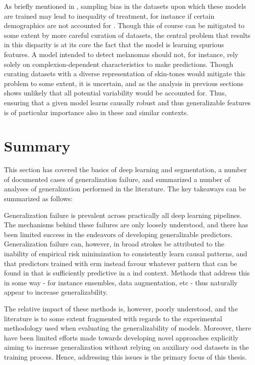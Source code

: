     As briefly mentioned in , sampling bias in the datasets upon which these models are trained may lead to inequality of treatment, for instance if certain demographics are not accounted for \cite{social_consequence_1}. Though this of course can be mitigated to some extent by more careful curation of datasets, the central problem that results in this disparity is at its core the fact that the model is learning spurious features. A model intended to detect melanomas should not, for instance, rely solely on complexion-dependent characteristics to make predictions. Though curating datasets with a diverse representation of skin-tones would mitigate this problem to some extent, it is uncertain, and as the analysis in previous sections shows unlikely that all potential variability would be accounted for. Thus, ensuring that a given model learns causally robust and thus generalizable features is of particular importance also in these and similar contexts. 
    
    
\section{Summary}
This section has covered the basics of deep learning and segmentation, a number of documented cases of generalization failure, and summarized a number of analyses of generalization performed in the literature. The key takeaways can be summarized as follows: 

Generalization failure is prevalent across practically all deep learning pipelines. The mechanisms behind these failures are only loosely understood, and there has been limited success in the endeavors of developing generalizable predictors. Generalization failure can, however, in broad strokes be attributed to the inability of empirical risk minimization to consistently learn causal patterns, and that predictors trained with \gls{erm} instead favour whatever pattern that can be found in that is sufficiently predictive in a \gls{ind} context. Methods that address this in some way - for instance ensembles, data augmentation, etc - thus naturally appear to increase generalizability. 

The relative impact of these methods is, however, poorly understood, and the literature is to some extent fragmented with regards to the experimental methodology used when evaluating the generalizability of models. Moreover, there have been limited efforts made towards developing novel approaches explicitly aiming to increase generalization without relying on auxiliary \gls{ood} datasets in the training process. Hence, addressing this issues is the primary focus of this thesis.


